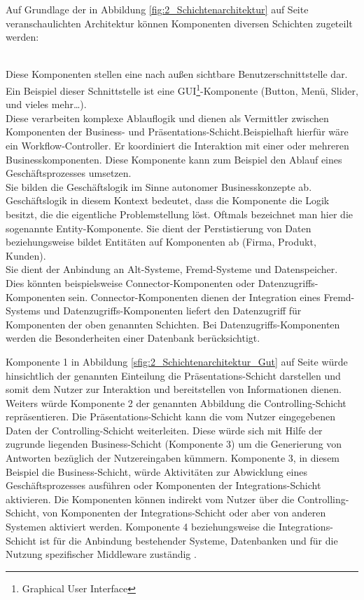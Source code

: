 Auf Grundlage der in Abbildung \ref{fig:2_Schichtenarchitektur} auf Seite \pageref{fig:2_Schichtenarchitektur} veranschaulichten Architektur können Komponenten diversen Schichten zugeteilt werden:
\begin{enumerate}
 \hfill \\
Diese Komponenten stellen eine nach außen sichtbare Benutzerschnittstelle dar. Ein Beispiel dieser Schnittstelle ist eine GUI\footnote{Graphical User Interface}-Komponente (Button, Menü, Slider, und vieles mehr\ldots).
 \hfill \\
Diese verarbeiten komplexe Ablauflogik und dienen als Vermittler zwischen Komponenten der Business- und Präsentations-Schicht.Beispielhaft hierfür wäre ein Workflow-Controller. Er koordiniert die Interaktion mit einer oder mehreren Businesskomponenten. Diese Komponente kann zum Beispiel den Ablauf eines Geschäftsprozesses umsetzen.
 \hfill \\
Sie bilden die Geschäftslogik im Sinne autonomer Businesskonzepte ab. Geschäftslogik in diesem Kontext bedeutet, dass die Komponente die Logik besitzt, die die eigentliche Problemstellung löst. Oftmals bezeichnet man hier die sogenannte Entity-Komponente. Sie dient der Perstistierung von Daten beziehungsweise bildet Entitäten auf Komponenten ab (Firma, Produkt, Kunden).
 \hfill \\
Sie dient der Anbindung an Alt-Systeme, Fremd-Systeme und Datenspeicher. Dies könnten beispielsweise Connector-Komponenten oder Datenzugriffs-Komponenten sein. Connector-Komponenten dienen der Integration eines Fremd-Systems und Datenzugriffs-Komponenten liefert den Datenzugriff für Komponenten der oben genannten Schichten. Bei Datenzugriffs-Komponenten werden die Besonderheiten einer Datenbank berücksichtigt.
\end{enumerate}

Komponente 1 in Abbildung \ref{sfig:2_Schichtenarchitektur_Gut} auf Seite \pageref{sfig:2_Schichtenarchitektur_Gut} würde hinsichtlich der genannten Einteilung die Präsentations-Schicht darstellen und somit dem Nutzer zur Interaktion und bereitstellen von Informationen dienen. Weiters würde Komponente 2 der genannten Abbildung die Controlling-Schicht repräsentieren. Die Präsentations-Schicht kann die vom Nutzer eingegebenen Daten der Controlling-Schicht weiterleiten. Diese würde sich mit Hilfe der zugrunde liegenden Business-Schicht (Komponente 3) um die Generierung von Antworten bezüglich der Nutzereingaben kümmern. Komponente 3, in diesem Beispiel die Business-Schicht, würde Aktivitäten zur Abwicklung eines Geschäftsprozesses ausführen oder Komponenten der Integrations-Schicht aktivieren. Die Komponenten können indirekt vom Nutzer über die Controlling-Schicht, von Komponenten der Integrations-Schicht oder aber von anderen Systemen aktiviert werden. Komponente 4 beziehungsweise die Integrations-Schicht ist für die Anbindung bestehender Systeme, Datenbanken und für die Nutzung spezifischer Middleware zuständig \citereset \autocite{Andresen.2003}.\\

